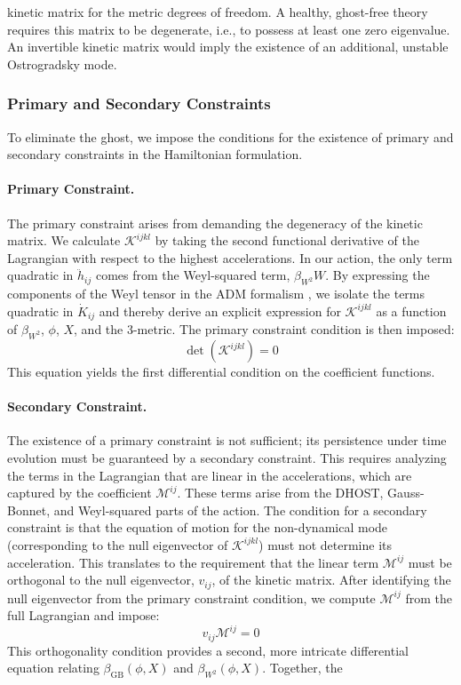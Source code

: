 \documentclass[twocolumn]{aastex631}
\begin{document}
kinetic matrix for the metric degrees of freedom. A healthy, ghost-free theory requires this matrix to be degenerate, i.e., to possess at least one zero eigenvalue. An invertible kinetic matrix would imply the existence of an additional, unstable Ostrogradsky mode.\subsubsection{Primary and Secondary Constraints}To eliminate the ghost, we impose the conditions for the existence of primary and secondary constraints in the Hamiltonian formulation. \citep{wipf1993hamiltonsformalismsystemsconstraints,dolan2021constraineddynamicshamiltonianformalism,kaltsas2025constrainedhamiltoniansystemsphysicsinformed}\paragraph{Primary Constraint.} The primary constraint arises from demanding the degeneracy of the kinetic matrix. We calculate $\mathcal{K}^{ijkl}$ by taking the second functional derivative of the Lagrangian with respect to the highest accelerations. In our action, the only term quadratic in $\ddot{h}_{ij}$ comes from the Weyl-squared term, $\beta_{W^2} W$. By expressing the components of the Weyl tensor in the ADM formalism \citep{watson2025intrinsiccoordinatereferenceframe,watson2025intrinsiccoordinatereferenceframe}, we isolate the terms quadratic in $\dot{K}_{ij}$ and thereby derive an explicit expression for $\mathcal{K}^{ijkl}$ as a function of $\beta_{W^2}$, $\phi$, $X$, and the 3-metric. The primary constraint condition is then imposed:\begin{equation}\det(\mathcal{K}^{ijkl}) = 0\end{equation}This equation yields the first differential condition on the coefficient functions.\paragraph{Secondary Constraint.} The existence of a primary constraint is not sufficient; its persistence under time evolution must be guaranteed by a secondary constraint. This requires analyzing the terms in the Lagrangian that are linear in the accelerations, which are captured by the coefficient $\mathcal{M}^{ij}$. These terms arise from the DHOST, Gauss-Bonnet, and Weyl-squared parts of the action. The condition for a secondary constraint is that the equation of motion for the non-dynamical mode (corresponding to the null eigenvector of $\mathcal{K}^{ijkl}$) must not determine its acceleration. This translates to the requirement that the linear term $\mathcal{M}^{ij}$ must be orthogonal to the null eigenvector, $v_{ij}$, of the kinetic matrix. After identifying the null eigenvector from the primary constraint condition, we compute $\mathcal{M}^{ij}$ from the full Lagrangian and impose:\begin{equation}v_{ij}\mathcal{M}^{ij} = 0\end{equation}This orthogonality condition provides a second, more intricate differential equation relating $\beta_{\text{GB}}(\phi, X)$ and $\beta_{W^2}(\phi, X)$. Together, the 
\end{document}
